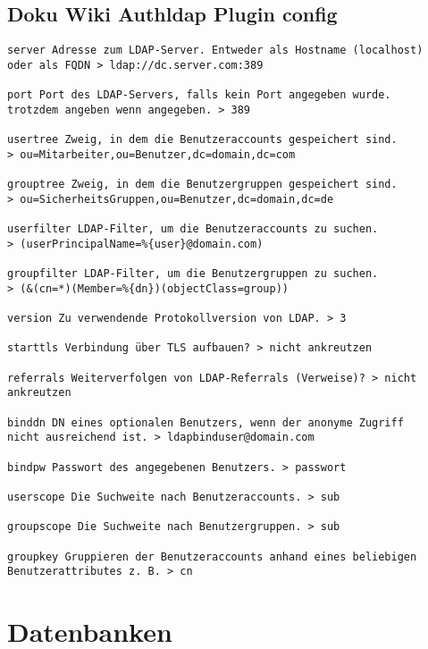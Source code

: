 \documentclass[a4paper,10pt]{report}
\begin{document}
\section{Doku Wiki Authldap Plugin config}
\begin{verbatim}
server Adresse zum LDAP-Server. Entweder als Hostname (localhost)
oder als FQDN > ldap://dc.server.com:389

port Port des LDAP-Servers, falls kein Port angegeben wurde. 
trotzdem angeben wenn angegeben. > 389

usertree Zweig, in dem die Benutzeraccounts gespeichert sind.
> ou=Mitarbeiter,ou=Benutzer,dc=domain,dc=com    

grouptree Zweig, in dem die Benutzergruppen gespeichert sind. 
> ou=SicherheitsGruppen,ou=Benutzer,dc=domain,dc=de

userfilter LDAP-Filter, um die Benutzeraccounts zu suchen.
> (userPrincipalName=%{user}@domain.com)

groupfilter LDAP-Filter, um die Benutzergruppen zu suchen. 
> (&(cn=*)(Member=%{dn})(objectClass=group))

version Zu verwendende Protokollversion von LDAP. > 3   

starttls Verbindung über TLS aufbauen? > nicht ankreutzen 

referrals Weiterverfolgen von LDAP-Referrals (Verweise)? > nicht ankreutzen

binddn DN eines optionalen Benutzers, wenn der anonyme Zugriff 
nicht ausreichend ist. > ldapbinduser@domain.com

bindpw Passwort des angegebenen Benutzers. > passwort

userscope Die Suchweite nach Benutzeraccounts. > sub

groupscope Die Suchweite nach Benutzergruppen. > sub

groupkey Gruppieren der Benutzeraccounts anhand eines beliebigen 
Benutzerattributes z. B. > cn

\end{verbatim}


\chapter{Datenbanken}
\end{document}

